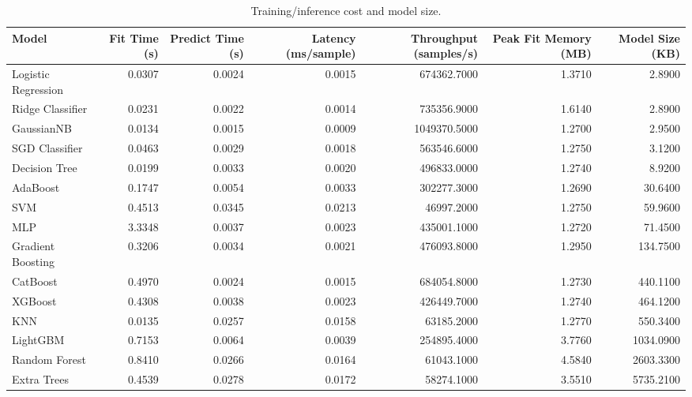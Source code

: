 \begin{table}
\caption{Training/inference cost and model size.}
\label{tab:compute}
\begin{tabular}{lrrrrrr}
\toprule
Model & Fit Time (s) & Predict Time (s) & Latency (ms/sample) & Throughput (samples/s) & Peak Fit Memory (MB) & Model Size (KB) \\
\midrule
Logistic Regression & 0.0307 & 0.0024 & 0.0015 & 674362.7000 & 1.3710 & 2.8900 \\
Ridge Classifier & 0.0231 & 0.0022 & 0.0014 & 735356.9000 & 1.6140 & 2.8900 \\
GaussianNB & 0.0134 & 0.0015 & 0.0009 & 1049370.5000 & 1.2700 & 2.9500 \\
SGD Classifier & 0.0463 & 0.0029 & 0.0018 & 563546.6000 & 1.2750 & 3.1200 \\
Decision Tree & 0.0199 & 0.0033 & 0.0020 & 496833.0000 & 1.2740 & 8.9200 \\
AdaBoost & 0.1747 & 0.0054 & 0.0033 & 302277.3000 & 1.2690 & 30.6400 \\
SVM & 0.4513 & 0.0345 & 0.0213 & 46997.2000 & 1.2750 & 59.9600 \\
MLP & 3.3348 & 0.0037 & 0.0023 & 435001.1000 & 1.2720 & 71.4500 \\
Gradient Boosting & 0.3206 & 0.0034 & 0.0021 & 476093.8000 & 1.2950 & 134.7500 \\
CatBoost & 0.4970 & 0.0024 & 0.0015 & 684054.8000 & 1.2730 & 440.1100 \\
XGBoost & 0.4308 & 0.0038 & 0.0023 & 426449.7000 & 1.2740 & 464.1200 \\
KNN & 0.0135 & 0.0257 & 0.0158 & 63185.2000 & 1.2770 & 550.3400 \\
LightGBM & 0.7153 & 0.0064 & 0.0039 & 254895.4000 & 3.7760 & 1034.0900 \\
Random Forest & 0.8410 & 0.0266 & 0.0164 & 61043.1000 & 4.5840 & 2603.3300 \\
Extra Trees & 0.4539 & 0.0278 & 0.0172 & 58274.1000 & 3.5510 & 5735.2100 \\
\bottomrule
\end{tabular}
\end{table}
